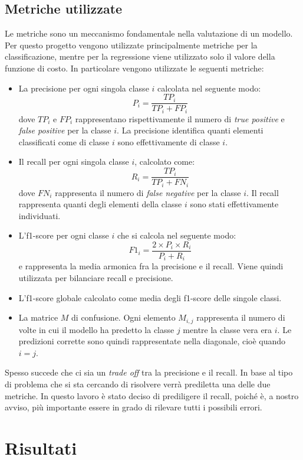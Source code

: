 \subsection{Metriche utilizzate}\label{subsec:metriche}
Le metriche sono un meccanismo fondamentale nella valutazione di un modello. 
Per questo progetto vengono utilizzate principalmente metriche per la classificazione, mentre per la regressione viene utilizzato solo il valore della funzione di costo.
In particolare vengono utilizzate le seguenti metriche:
    \begin{itemize}
        \item La precisione per ogni singola classe $i$ calcolata nel seguente modo:
            \[P_i = \frac{TP_i}{TP_i + FP_i}\]
            dove $TP_i$ e $FP_i$ rappresentano rispettivamente il numero di \textit{true positive} e \textit{false positive} per la classe $i$.             
            La precisione identifica quanti elementi classificati come di classe $i$ sono effettivamente di classe $i$.
        \item Il recall per ogni singola classe $i$, calcolato come:
            \[R_i = \frac{TP_i}{TP_i + FN_i}\]
            dove $FN_i$ rappresenta il numero di \textit{false negative} per la classe $i$.
            Il recall rappresenta quanti degli elementi della classe $i$ sono stati effettivamente individuati.
        \item L'f1-score per ogni classe $i$ che si calcola nel seguente modo:
            \[F1_i = \frac{2 \times P_i \times R_i}{P_i + R_i}\]
            e rappresenta la media armonica fra la precisione e il recall. Viene quindi utilizzata per bilanciare recall e precisione.
        \item L'f1-score globale calcolato come media degli f1-score delle singole classi.
        \item La matrice $M$ di confusione. Ogni elemento $M_{i,j}$ rappresenta il numero di volte in cui il modello ha predetto la classe $j$ mentre la classe vera era $i$.
         Le predizioni corrette sono quindi rappresentate nella diagonale, cioè quando $i=j$.
    \end{itemize}
Spesso succede che ci sia un \textit{trade off} tra la precisione e il recall.
In base al tipo di problema che si sta cercando di risolvere verrà prediletta una delle due metriche.
In questo lavoro è stato deciso di prediligere il recall, poiché è, a nostro avviso, più importante essere in grado di rilevare tutti i possibili errori.

\section{Risultati}\label{sec:risultati}
